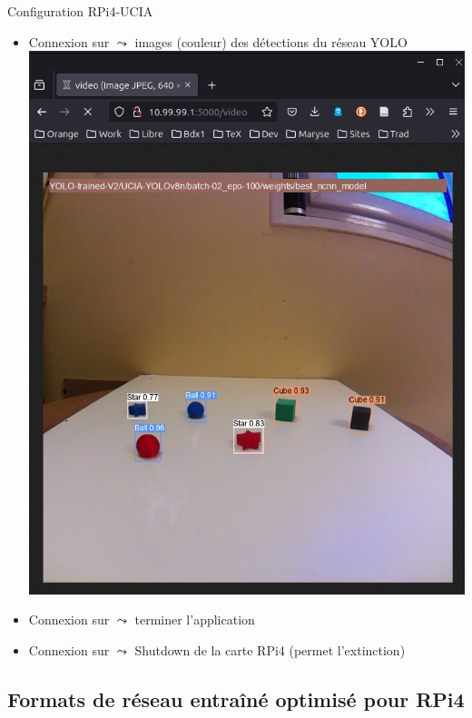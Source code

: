 \documentclass[11pt,serif,mathserif,compress,hyperref={colorlinks}]{beamer}
\begin{document}
\begin{frame}{Configuration RPi4-UCIA}
  
  \begin{tcolorbox}[title=Exploitation des réseaux YOLO : Navigateur web, add to width=.7cm, height=68mm]
    {\small
      \begin{itemize}
      \item<2-> Connexion sur  $\leadsto$ images (couleur) des détections du réseau YOLO\\
         {\vspace*{-3cm}\includegraphics[width=.6\textwidth]{images/detect_camera-3_b.png}}
      \item<4-> Connexion sur  $\leadsto$ terminer l'application
      \item<4-> Connexion sur  $\leadsto$ Shutdown de la carte RPi4 (permet l'extinction)
      \end{itemize}
    }
    
  \end{tcolorbox}
    
\end{frame}

\subsection{Formats de réseau entraîné optimisé pour RPi4}
\end{document}
